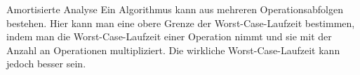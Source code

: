 \begin{TOP}{Amortisierte Analyse}
	Ein Algorithmus kann aus mehreren Operationsabfolgen bestehen. Hier kann man eine obere  Grenze der Worst-Case-Laufzeit bestimmen, indem man die Worst-Case-Laufzeit einer Operation nimmt und sie mit der Anzahl an Operationen multipliziert. Die wirkliche Worst-Case-Laufzeit kann jedoch besser sein.
\end{TOP}

